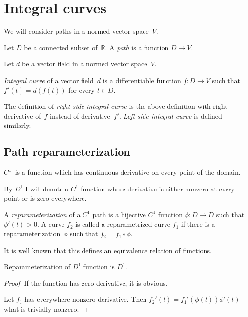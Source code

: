 \section{Integral curves}

We will consider paths in a normed vector space~$V$.

\begin{defn}
Let $D$ be a connected subset of~$\mathbb{R}$. A \emph{path} is a function $D\rightarrow V$.
\end{defn}

Let $d$ be a vector field in a normed vector space~$V$.

\begin{defn}
\emph{Integral curve} of a vector field~$d$ is a differentiable function $f:D\rightarrow V$ such that $f'(t)=d(f(t))$ for every $t\in D$.
\end{defn}

\begin{defn}
The definition of \emph{right side integral curve} is the above definition with right derivative of~$f$ instead of derivative~$f'$.
\emph{Left side integral curve} is defined similarly.
\end{defn}

\subsection{Path reparameterization}

$C^1$~is a function which has continuous derivative on every point of the domain.

By $D^1$ I will denote a $C^1$ function whose derivative is either nonzero at every point or is zero everywhere.

\begin{defn}
A \emph{reparameterization} of a $C^1$ path is a bijective $C^1$ function $\phi:D\rightarrow D$ such that
$\phi'(t)>0$. A curve $f_2$ is called a reparametrized curve $f_1$ if there is a reparameterization~$\phi$ such that
$f_2=f_1\circ\phi$.
\end{defn}

It is well known that this defines an equivalence relation of functions.

\begin{prop}
Reparameterization of $D^1$ function is $D^1$.
\end{prop}

\begin{proof}
If the function has zero derivative, it is obvious.

Let $f_1$ has everywhere nonzero derivative. Then $f_2'(t) = f_1'(\phi(t))\phi'(t)$ what is trivially nonzero.
\end{proof}

